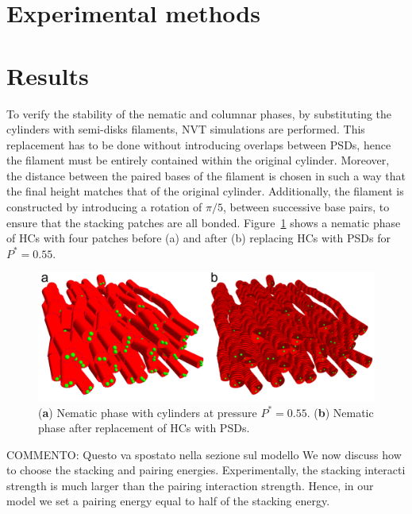 \documentclass[aip,jcp, amsmath, amssymb, reprint]{revtex4-1}
\begin{document}
\section{\label{exp}Experimental methods}

\section{\label{Results}Results}
To verify the stability of the nematic and columnar phases, by substituting the cylinders with semi-disks filaments, NVT
simulations are performed. 
This replacement has to be done without introducing overlaps between PSDs, hence
the filament must be entirely contained within the original cylinder. Moreover,
the distance between the paired bases of the filament is chosen in such a way that the final 
height matches that of the original cylinder. Additionally, the filament is constructed by introducing a rotation of $\pi/5$, between successive base
pairs, to ensure that the stacking patches are all bonded. 
Figure~\ref{sosti1} shows a nematic phase of HCs with four patches before (a) and after (b)
replacing HCs with PSDs for $P^*=0.55$. 

\begin{figure}[h!]
\includegraphics[width=0.9\linewidth]{sosti1.png} 
\caption{\label{sosti1} (\textbf{a}) Nematic phase with cylinders at pressure $P^*=0.55$. (\textbf{b}) Nematic phase after replacement of HCs with PSDs. } 
\end{figure} 

{\color{red} COMMENTO: Questo va spostato nella sezione sul modello}
We now discuss how to choose the stacking and pairing energies. Experimentally, the stacking interacti
strength is much larger than the pairing interaction strength. 
Hence, in our model we set a pairing energy equal to half of the stacking energy.
\end{document}
